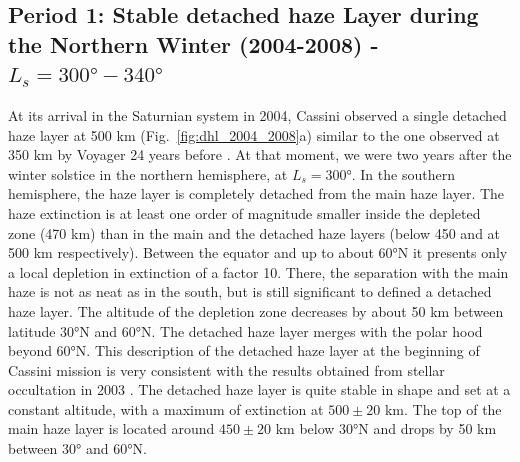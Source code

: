 \subsection{Period 1: Stable detached haze Layer during the Northern Winter (2004-2008) - $L_s=\ang{300}-\ang{340}$}

At its arrival in the Saturnian system in 2004, Cassini observed a single detached haze layer at 500 km
(Fig.~\ref{fig:dhl_2004_2008}a) similar to the one observed at 350 km by Voyager 24 years before
\citep{Smith1981}. At that moment, we were two years after the winter solstice in the northern hemisphere, at $L_s=\ang{300}$.
In the southern hemisphere, the haze layer is completely detached from the main haze layer. The haze extinction is at least
one order of magnitude smaller inside the depleted zone (470 km) than in the main and the detached haze layers (below 450 and
at 500 km respectively). Between the equator and up to about \ang{60}N it presents only a local depletion in extinction
of a factor 10. There, the separation with the main haze is not as neat as in the south, but is still significant to
defined a detached haze layer.
The altitude of the depletion zone decreases by about 50 km between latitude \ang{30}N  and \ang{60}N.
The detached haze layer merges with the polar hood beyond \ang{60}N. This description of the detached haze layer at
the beginning of Cassini mission is very consistent with the results obtained from stellar occultation in 2003 \citep{Sicardy2006}.
The detached haze layer is quite stable in shape and set at a constant altitude, with a maximum of extinction
at $500 \pm 20$ km. The top of the main haze layer is located around $450 \pm 20$ km below \ang{30}N and drops
by 50 km between \ang{30} and \ang{60}N.

